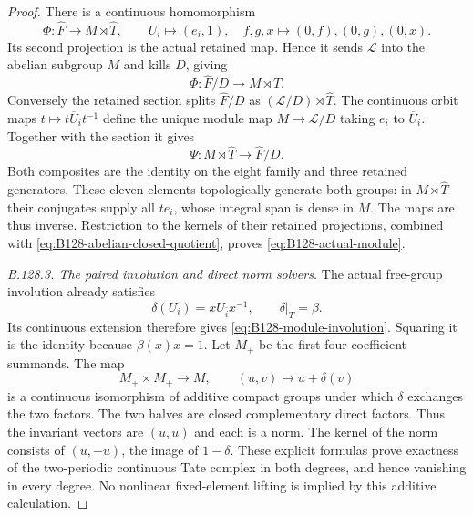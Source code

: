 \begin{proof}
There is a continuous homomorphism
\[
 \Phi:\widehat F\longrightarrow M\rtimes\widehat T,
 \qquad U_i\longmapsto(e_i,1),\quad
 f,g,x\longmapsto(0,f),(0,g),(0,x).
\]
Its second projection is the actual retained map. Hence it sends
$\mathcal L$ into the abelian subgroup $M$ and kills $D$, giving
\[
 \overline\Phi:\widehat F/D\longrightarrow M\rtimes\widehat T.
\]
Conversely the retained section splits $\widehat F/D$ as
$(\mathcal L/D)\rtimes\widehat T$. The continuous orbit maps
$t\mapsto t\overline U_i t^{-1}$ define the unique module map
$M\to\mathcal L/D$ taking $e_i$ to $\overline U_i$. Together
with the section it gives
\[
 \Psi:M\rtimes\widehat T\longrightarrow\widehat F/D.
\]
Both composites are the identity on the eight family and three
retained generators. These eleven elements topologically generate
both groups: in $M\rtimes\widehat T$ their conjugates supply all
$t e_i$, whose integral span is dense in $M$. The maps are thus
inverse. Restriction to the kernels of their retained projections,
combined with \eqref{eq:B128-abelian-closed-quotient}, proves
\eqref{eq:B128-actual-module}.

\emph{B.128.3. The paired involution and direct norm solvers.}
The actual free-group involution already satisfies
\[
 \delta(U_i)=xU_{\bar i}x^{-1},\qquad\delta|_T=\beta.
\]
Its continuous extension therefore gives
\eqref{eq:B128-module-involution}. Squaring it is the identity
because $\beta(x)x=1$.
Let $M_+$ be the first four coefficient summands. The map
\[
 M_+\times M_+\longrightarrow M,\qquad
 (u,v)\longmapsto u+\delta(v)
\]
is a continuous isomorphism of additive compact groups under
which $\delta$ exchanges the two factors. The two halves are
closed complementary direct factors. Thus the invariant vectors
are $(u,u)$ and each is a norm. The kernel of the norm consists
of $(u,-u)$, the image of $1-\delta$. These explicit formulas
prove exactness of the two-periodic continuous Tate complex in
both degrees, and hence vanishing in every degree. No nonlinear
fixed-element lifting is implied by this additive calculation.


\end{proof}
